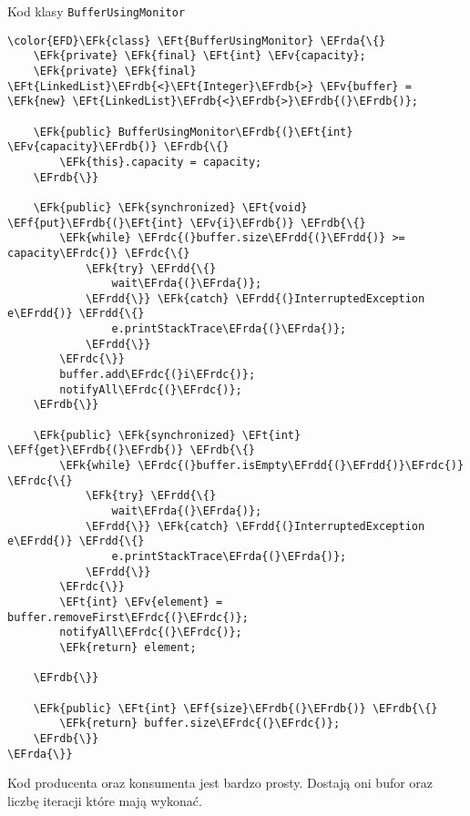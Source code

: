 \documentclass[11pt]{article}
\newcommand{\EFk}[1]{\textcolor{EFk}{#1}} %
\newcommand{\EFf}[1]{\textcolor{EFf}{#1}} %
\newcommand{\EFv}[1]{\textcolor{EFv}{#1}} %
\newcommand{\EFt}[1]{\textcolor{EFt}{#1}} %
\newcommand{\EFrda}[1]{#1} %
\newcommand{\EFrdb}[1]{\textcolor{EFrdb}{#1}} %
\newcommand{\EFrdc}[1]{\textcolor{EFrdc}{#1}} %
\newcommand{\EFrdd}[1]{\textcolor{EFrdd}{#1}} %
\begin{document}
Kod klasy \texttt{BufferUsingMonitor}
\begin{Code}
\begin{Verbatim}
\color{EFD}\EFk{class} \EFt{BufferUsingMonitor} \EFrda{\{}
    \EFk{private} \EFk{final} \EFt{int} \EFv{capacity};
    \EFk{private} \EFk{final} \EFt{LinkedList}\EFrdb{<}\EFt{Integer}\EFrdb{>} \EFv{buffer} = \EFk{new} \EFt{LinkedList}\EFrdb{<}\EFrdb{>}\EFrdb{(}\EFrdb{)};

    \EFk{public} BufferUsingMonitor\EFrdb{(}\EFt{int} \EFv{capacity}\EFrdb{)} \EFrdb{\{}
        \EFk{this}.capacity = capacity;
    \EFrdb{\}}

    \EFk{public} \EFk{synchronized} \EFt{void} \EFf{put}\EFrdb{(}\EFt{int} \EFv{i}\EFrdb{)} \EFrdb{\{}
        \EFk{while} \EFrdc{(}buffer.size\EFrdd{(}\EFrdd{)} >= capacity\EFrdc{)} \EFrdc{\{}
            \EFk{try} \EFrdd{\{}
                wait\EFrda{(}\EFrda{)};
            \EFrdd{\}} \EFk{catch} \EFrdd{(}InterruptedException e\EFrdd{)} \EFrdd{\{}
                e.printStackTrace\EFrda{(}\EFrda{)};
            \EFrdd{\}}
        \EFrdc{\}}
        buffer.add\EFrdc{(}i\EFrdc{)};
        notifyAll\EFrdc{(}\EFrdc{)};
    \EFrdb{\}}

    \EFk{public} \EFk{synchronized} \EFt{int} \EFf{get}\EFrdb{(}\EFrdb{)} \EFrdb{\{}
        \EFk{while} \EFrdc{(}buffer.isEmpty\EFrdd{(}\EFrdd{)}\EFrdc{)} \EFrdc{\{}
            \EFk{try} \EFrdd{\{}
                wait\EFrda{(}\EFrda{)};
            \EFrdd{\}} \EFk{catch} \EFrdd{(}InterruptedException e\EFrdd{)} \EFrdd{\{}
                e.printStackTrace\EFrda{(}\EFrda{)};
            \EFrdd{\}}
        \EFrdc{\}}
        \EFt{int} \EFv{element} = buffer.removeFirst\EFrdc{(}\EFrdc{)};
        notifyAll\EFrdc{(}\EFrdc{)};
        \EFk{return} element;

    \EFrdb{\}}

    \EFk{public} \EFt{int} \EFf{size}\EFrdb{(}\EFrdb{)} \EFrdb{\{}
        \EFk{return} buffer.size\EFrdc{(}\EFrdc{)};
    \EFrdb{\}}
\EFrda{\}}
\end{Verbatim}
\end{Code}

Kod producenta oraz konsumenta jest bardzo prosty. Dostają oni bufor oraz
liczbę iteracji które mają wykonać.
\end{document}
